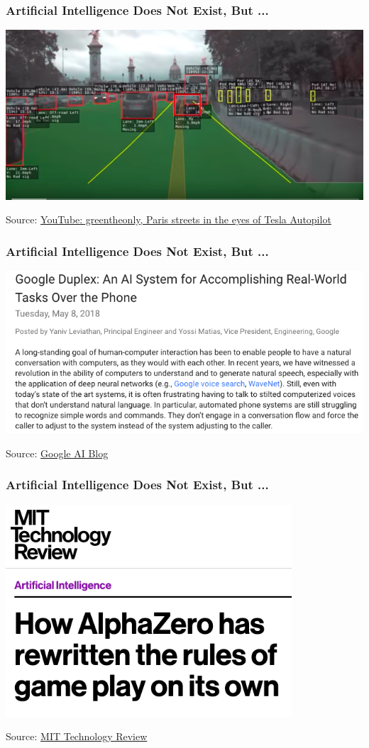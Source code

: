 \begin{frame}
\frametitle{Artificial Intelligence Does Not Exist, But ...}
\includegraphics[width=\textwidth]{graphics/tesla_paris}

Source: \href{https://www.youtube.com/watch?v=_1MHGUC_BzQs}{YouTube: greentheonly, Paris streets in the eyes of Tesla Autopilot}
\end{frame}

\begin{frame}
\frametitle{Artificial Intelligence Does Not Exist, But ...}
\includegraphics[width=\textwidth]{graphics/google_duplex}

Source: \href{https://ai.googleblog.com/2018/05/duplex-ai-system-for-natural-conversation.html}{Google AI Blog}
\end{frame}

\begin{frame}
\frametitle{Artificial Intelligence Does Not Exist, But ...}
\includegraphics[width=0.8\textwidth]{graphics/alpha_go}

Source: \href{https://www.technologyreview.com/s/612923/how-alphazero-has-rewritten-the-rules-of-gameplay-on-its-own/}{MIT Technology Review}
\end{frame}

